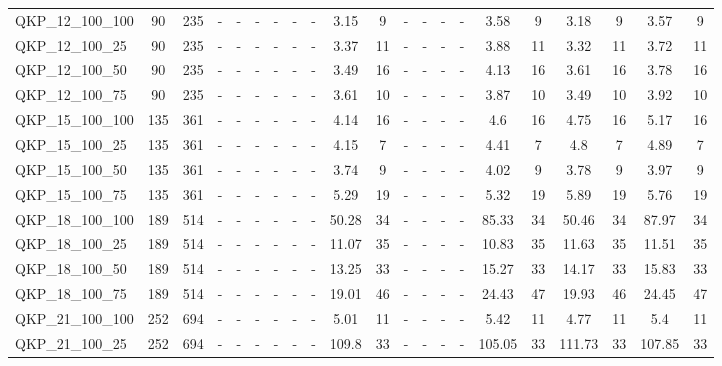 \begin{sidewaystable}[!ht]
{\begin{tabular}{lcccccccccccccccccccc}
QKP\_12\_100\_100 & 90 & 235 &  - &  - &  - &  - &  - &  - &  \textcolor{blue2}{3.15} & 9 &  - &  - &  - &  - & 3.58 & 9 & 3.18 & 9 & 3.57 & 9 \\
QKP\_12\_100\_25 & 90 & 235 &  - &  - &  - &  - &  - &  - & 3.37 & 11 &  - &  - &  - &  - & 3.88 & 11 &  \textcolor{blue2}{3.32} & 11 & 3.72 & 11 \\
QKP\_12\_100\_50 & 90 & 235 &  - &  - &  - &  - &  - &  - &  \textcolor{blue2}{3.49} & 16 &  - &  - &  - &  - & 4.13 & 16 & 3.61 & 16 & 3.78 & 16 \\
QKP\_12\_100\_75 & 90 & 235 &  - &  - &  - &  - &  - &  - & 3.61 & 10 &  - &  - &  - &  - & 3.87 & 10 &  \textcolor{blue2}{3.49} & 10 & 3.92 & 10 \\
QKP\_15\_100\_100 & 135 & 361 &  - &  - &  - &  - &  - &  - &  \textcolor{blue2}{4.14} & 16 &  - &  - &  - &  - & 4.6 & 16 & 4.75 & 16 & 5.17 & 16 \\
QKP\_15\_100\_25 & 135 & 361 &  - &  - &  - &  - &  - &  - &  \textcolor{blue2}{4.15} & 7 &  - &  - &  - &  - & 4.41 & 7 & 4.8 & 7 & 4.89 & 7 \\
QKP\_15\_100\_50 & 135 & 361 &  - &  - &  - &  - &  - &  - &  \textcolor{blue2}{3.74} & 9 &  - &  - &  - &  - & 4.02 & 9 & 3.78 & 9 & 3.97 & 9 \\
QKP\_15\_100\_75 & 135 & 361 &  - &  - &  - &  - &  - &  - &  \textcolor{blue2}{5.29} & 19 &  - &  - &  - &  - & 5.32 & 19 & 5.89 & 19 & 5.76 & 19 \\
QKP\_18\_100\_100 & 189 & 514 &  - &  - &  - &  - &  - &  - &  \textcolor{blue2}{50.28} & 34 &  - &  - &  - &  - & 85.33 & 34 & 50.46 & 34 & 87.97 & 34 \\
QKP\_18\_100\_25 & 189 & 514 &  - &  - &  - &  - &  - &  - & 11.07 & 35 &  - &  - &  - &  - &  \textcolor{blue2}{10.83} & 35 & 11.63 & 35 & 11.51 & 35 \\
QKP\_18\_100\_50 & 189 & 514 &  - &  - &  - &  - &  - &  - &  \textcolor{blue2}{13.25} & 33 &  - &  - &  - &  - & 15.27 & 33 & 14.17 & 33 & 15.83 & 33 \\
QKP\_18\_100\_75 & 189 & 514 &  - &  - &  - &  - &  - &  - &  \textcolor{blue2}{19.01} & 46 &  - &  - &  - &  - & 24.43 & 47 & 19.93 & 46 & 24.45 & 47 \\
QKP\_21\_100\_100 & 252 & 694 &  - &  - &  - &  - &  - &  - & 5.01 & 11 &  - &  - &  - &  - & 5.42 & 11 &  \textcolor{blue2}{4.77} & 11 & 5.4 & 11 \\
QKP\_21\_100\_25 & 252 & 694 &  - &  - &  - &  - &  - &  - & 109.8 & 33 &  - &  - &  - &  - &  \textcolor{blue2}{105.05} & 33 & 111.73 & 33 & 107.85 & 33 \\

\end{tabular}}
\end{sidewaystable}
